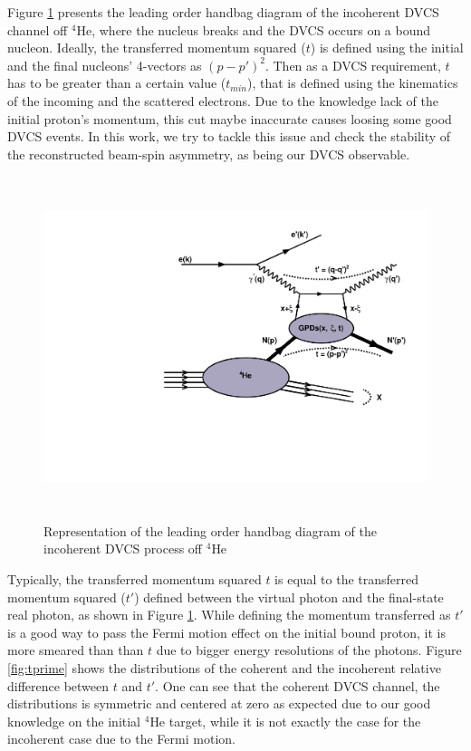 Figure \ref{fig:handbag} presents the leading order handbag diagram of the 
incoherent DVCS channel off $^4$He, where the nucleus breaks and the DVCS 
occurs on a bound nucleon. Ideally, the transferred momentum squared ($t$) is 
defined using the initial and the final nucleons' 4-vectors as $(p-p')^{2}$.  
Then as a DVCS requirement, $t$ has to be greater than a certain value 
($t_{min}$), that is defined using the kinematics of the incoming and the 
scattered electrons. Due to the knowledge lack of the initial proton's 
momentum, this cut maybe inaccurate causes loosing some good DVCS events. In 
this work, we try to tackle this issue and check the stability of the 
reconstructed beam-spin asymmetry, as being our DVCS observable.\\ 

\begin{figure}[h!]
   \centering
\includegraphics[height=10.0cm]{fig-incoh/handbag_incoherent.pdf}
\caption{Representation of the leading order handbag diagram of the incoherent 
DVCS process off $^4$He}
\label{fig:handbag}
\end{figure}

Typically, the transferred momentum squared $t$ is equal to the transferred 
momentum squared ($t'$) defined between the virtual photon and the final-state 
real photon, as shown in Figure \ref{fig:handbag}.  While defining the momentum 
transferred as $t'$ is a good way to pass the Fermi motion effect on the 
initial bound proton, it is more smeared than than $t$ due to bigger energy 
resolutions of the photons. Figure \ref{fig:tprime} shows the distributions of 
the coherent and the incoherent relative difference between $t$ and $t'$. One 
can see that the coherent DVCS channel, the distributions is symmetric and 
centered at zero as expected due to our good knowledge on the initial $^4$He 
target, while it is not exactly the case for the incoherent case due to the 
Fermi motion.\\            

